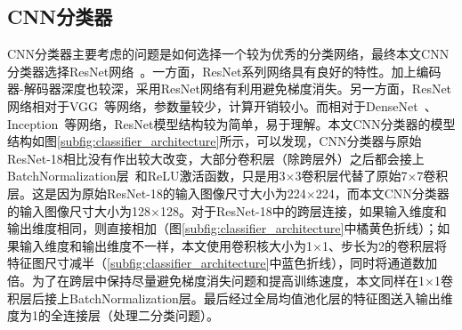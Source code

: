 \subsection{CNN分类器}\label{subsec:cnn_classifier_model}
CNN分类器主要考虑的问题是如何选择一个较为优秀的分类网络，最终本文CNN分类器选择ResNet网络~\cite{he2016deep}。一方面，ResNet系列网络具有良好的特性。加上编码器-解码器深度也较深，采用ResNet网络有利用避免梯度消失。另一方面，ResNet网络相对于VGG~\cite{simonyan2014very}等网络，参数量较少，计算开销较小。而相对于DenseNet~\cite{huang2017densely}、Inception~\cite{Szegedy2015RethinkingTI}等网络，ResNet模型结构较为简单，易于理解。本文CNN分类器的模型结构如图\ref{subfig:classifier_architecture}所示，可以发现，CNN分类器与原始ResNet-18相比没有作出较大改变，大部分卷积层（除跨层外）之后都会接上BatchNormalization层~\cite{ioffe2015batch}和ReLU激活函数，只是用3$\times$3卷积层代替了原始7$\times$7卷积层。这是因为原始ResNet-18的输入图像尺寸大小为224$\times$224，而本文CNN分类器的输入图像尺寸大小为128$\times$128。对于ResNet-18中的跨层连接，如果输入维度和输出维度相同，则直接相加（图\ref{subfig:classifier_architecture}中橘黄色折线）；如果输入维度和输出维度不一样，本文使用卷积核大小为1$\times$1、步长为2的卷积层将特征图尺寸减半（\ref{subfig:classifier_architecture}中蓝色折线），同时将通道数加倍。为了在跨层中保持尽量避免梯度消失问题和提高训练速度，本文同样在1$\times$1卷积层后接上BatchNormalization层。最后经过全局均值池化层的特征图送入输出维度为1的全连接层（处理二分类问题）。
